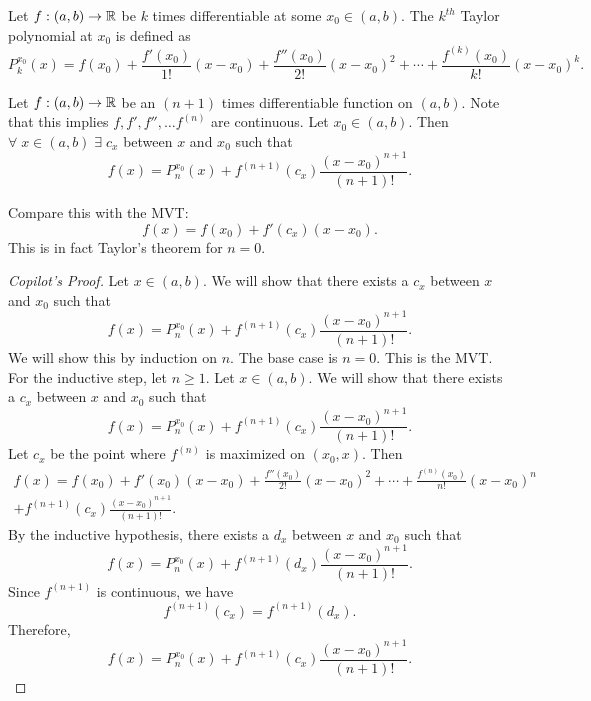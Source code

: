 
\begin{defn} \label{defn:taylor}
    Let $f : (a, b) \to \mathbb{R}$ be $k$ times differentiable at some $x_{0} \in (a, b)$. The $k^{th}$ Taylor polynomial at $x_{0}$ is defined as \[
        P_{k}^{x_{0}}(x) = f(x_{0}) + \frac{f'(x_{0})}{1!}(x - x_{0}) + \frac{f''(x_{0})}{2!}(x - x_{0})^{2} + \cdots + \frac{f^{(k)}(x_{0})}{k!}(x - x_{0})^{k}.
    \]
\end{defn}

\begin{thm} \label{thm:taylor}
    Let $f : (a, b) \to \mathbb{R}$ be an $(n + 1)$ times differentiable function on $(a, b)$.
    Note that this implies $f, f', f'', \dots f^{(n)}$ are continuous.
    Let $x_{0} \in (a, b)$.
    Then $\forall\; x \in (a, b) \;\exists\; c_{x}$ between $x$ and $x_{0}$ such that \[
        f(x) = P_{n}^{x_{0}}(x) + f^{(n+1)}(c_{x}) \frac{(x - x_{0})^{n+1}}{(n+1)!}.
    \]
\end{thm}
\begin{rem}
    Compare this with the MVT: \[
        f(x) = f(x_{0}) + f'(c_{x}) (x - x_{0}).
    \]
    This is in fact Taylor's theorem for $n = 0$.
\end{rem}

\begin{proof}[Copilot's Proof]
    Let $x \in (a, b)$.
    We will show that there exists a $c_{x}$ between $x$ and $x_{0}$ such that \[
        f(x) = P_{n}^{x_{0}}(x) + f^{(n+1)}(c_{x}) \frac{(x - x_{0})^{n+1}}{(n+1)!}.
    \]
    We will show this by induction on $n$.
    The base case is $n = 0$.
    This is the MVT.
    For the inductive step, let $n \geq 1$.
    Let $x \in (a, b)$.
    We will show that there exists a $c_{x}$ between $x$ and $x_{0}$ such that \[
        f(x) = P_{n}^{x_{0}}(x) + f^{(n+1)}(c_{x}) \frac{(x - x_{0})^{n+1}}{(n+1)!}.
    \]
    Let $c_{x}$ be the point where $f^{(n)}$ is maximized on $(x_{0}, x)$.
    Then \begin{multline}
        f(x) = f(x_{0}) + f'(x_{0})(x - x_{0}) + \frac{f''(x_{0})}{2!}(x - x_{0})^{2} + \cdots + \frac{f^{(n)}(x_{0})}{n!}(x - x_{0})^{n} \\
        + f^{(n+1)}(c_{x}) \frac{(x - x_{0})^{n+1}}{(n+1)!}.
    \end{multline}
    By the inductive hypothesis, there exists a $d_{x}$ between $x$ and $x_{0}$ such that \[
        f(x) = P_{n}^{x_{0}}(x) + f^{(n+1)}(d_{x}) \frac{(x - x_{0})^{n+1}}{(n+1)!}.
    \]
    Since $f^{(n+1)}$ is continuous, we have \[
        f^{(n+1)}(c_{x}) = f^{(n+1)}(d_{x}).
    \]
    Therefore, \[
        f(x) = P_{n}^{x_{0}}(x) + f^{(n+1)}(c_{x}) \frac{(x - x_{0})^{n+1}}{(n+1)!}.
    \]
\end{proof}


